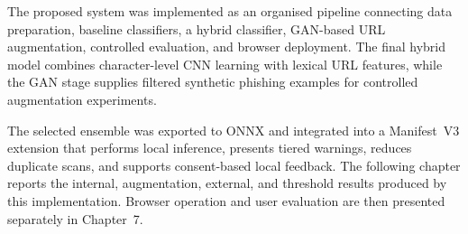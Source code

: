 The proposed system was implemented as an organised pipeline connecting data
preparation, baseline classifiers, a hybrid classifier, GAN-based URL
augmentation, controlled evaluation, and browser deployment. The final hybrid
model combines character-level CNN learning with lexical URL features, while
the GAN stage supplies filtered synthetic phishing examples for controlled
augmentation experiments.

The selected ensemble was exported to ONNX and integrated into a Manifest~V3
extension that performs local inference, presents tiered warnings, reduces
duplicate scans, and supports consent-based local feedback. The following
chapter reports the internal, augmentation, external, and threshold results
produced by this implementation. Browser operation and user evaluation are
then presented separately in Chapter~7.
